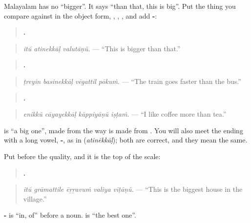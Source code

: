 \begin{grammarlens}[title={Grammar Lens: X-\ml{നെക്കാൾ}, \textquotedblleft{}than X\textquotedblright{}}]
Malayalam has no \textquotedblleft{}bigger\textquotedblright{}. It says \textquotedblleft{}than that, this is big\textquotedblright{}. Put the thing you compare against in the object form, \textbf{}, \textbf{}, \textbf{}, and add \textbf{-}:

\begin{quote}
\textbf{  .}
\end{quote}

\begin{quote}
\emph{itŭ atinekkāḷ valutāṇŭ.} — \textquotedblleft{}This is bigger than that.\textquotedblright{}
\end{quote}

\begin{quote}
\textbf{   .}
\end{quote}

\begin{quote}
\emph{ṭreyin basinekkāḷ vēgattil pōkuṁ.} — \textquotedblleft{}The train goes faster than the bus.\textquotedblright{}
\end{quote}

\begin{quote}
\textbf{   .}
\end{quote}

\begin{quote}
\emph{enikkŭ cāyayekkāḷ kāppiyāṇŭ iṣṭaṁ.} — \textquotedblleft{}I like coffee more than tea.\textquotedblright{}
\end{quote}

\textbf{} is \textquotedblleft{}a big one\textquotedblright{}, made from \textbf{} the way \textbf{} is made from \textbf{}. You will also meet the ending with a long vowel, \textbf{-}, as in \textbf{} (\emph{atinēkkāḷ}); both are correct, and they mean the same.
\end{grammarlens}

\begin{grammarlens}[title={Grammar Lens: \ml{ഏറ്റവും}, \textquotedblleft{}the most\textquotedblright{}}]
Put \textbf{} before the quality, and it is the top of the scale:

\begin{quote}
\textbf{    .}
\end{quote}

\begin{quote}
\emph{itŭ grāmattile ēṟṟavuṁ valiya vīṭāṇŭ.} — \textquotedblleft{}This is the biggest house in the village.\textquotedblright{}
\end{quote}

\textbf{-} is \textquotedblleft{}in, of\textquotedblright{} before a noun. \textbf{ } is \textquotedblleft{}the best one\textquotedblright{}.
\end{grammarlens}

